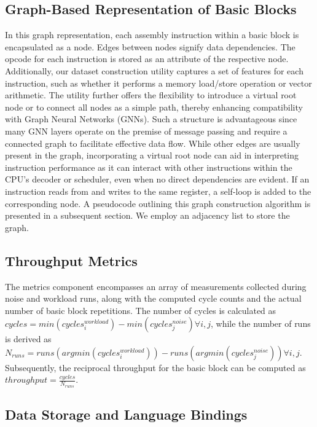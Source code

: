 \subsection{Graph-Based Representation of Basic Blocks}

In this graph representation, each assembly instruction within a basic block is encapsulated as a 
node. Edges between nodes signify data dependencies. The opcode for each instruction is stored as 
an attribute of the respective node. Additionally, our dataset construction utility captures a set 
of features for each instruction, such as whether it performs a memory load/store operation or vector 
arithmetic. The utility further offers the flexibility to introduce a virtual root node or to connect 
all nodes as a simple path, thereby enhancing compatibility with Graph Neural Networks (GNNs). Such 
a structure is advantageous since many GNN layers operate on the premise of message passing and require 
a connected graph to facilitate effective data flow. While other edges are usually present in the graph, 
incorporating a virtual root node can aid in interpreting instruction performance as it can interact with 
other instructions within the CPU's decoder or scheduler, even when no direct dependencies are evident. 
If an instruction reads from and writes to the same register, a self-loop is added to the corresponding 
node. A pseudocode outlining this graph construction algorithm is presented in a subsequent section. 
We employ an adjacency list to store the graph.

\subsection{Throughput Metrics}

The metrics component encompasses an array of measurements collected during noise and workload runs, 
along with the computed cycle counts and the actual number of basic block repetitions. The number of 
cycles is calculated as
$cycles = min(cycles^{workload}_i) - min(cycles^{noise}_j) \forall i, j$, while the number of runs 
is derived as $N_{runs} = runs(argmin(cycles^{workload}_i)) - runs(argmin(cycles^{noise}_j)) \forall i, j$. 
Subsequently, the reciprocal throughput for the basic block can be computed as 
$throughput = \frac{cycles}{N_{runs}}$.

\subsection{Data Storage and Language Bindings}

